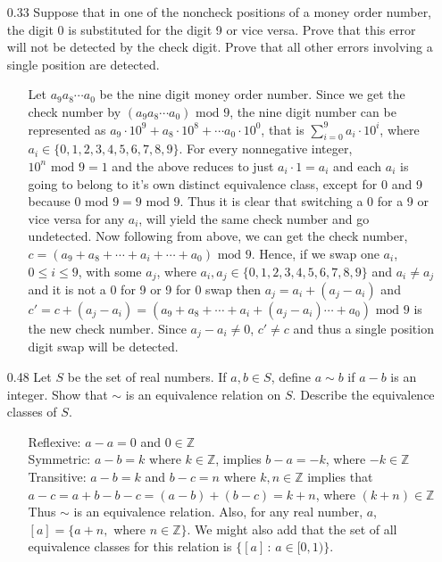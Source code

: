 \documentclass[12pt]{article}
\begin{document}
\begin{enumerate}
\begin{enumerate}
\end{enumerate}

\item[0.33] Suppose that in one of the noncheck positions of a money order number, the
digit 0 is substituted for the digit 9 or vice versa. Prove that this error will not be detected
by the check digit. Prove that all other errors involving a single position are detected.
\begin{enumerate}
\item[] Let $a_9a_8\cdots a_0$ be the nine digit money order number. Since we get the check number 
by $(a_9a_8\cdots a_0)\mbox{ mod }9$, the nine digit number can be represented as 
$a_9\cdot 10^9 + a_8\cdot 10^8 + \cdots a_0\cdot 10^0$, that is 
$\sum^9_{i = 0}a_i\cdot 10^i$, where $a_i \in \{0, 1, 2, 3, 4, 5, 6, 7, 8, 9\}$. 
For every nonnegative integer, $10^n\mbox{ mod } 9 = 1$ and the above reduces to just 
$a_i \cdot 1 = a_i$ and each $a_i$ is going to belong to it's own distinct equivalence class, 
except for 0 and 9 because $0\mbox{ mod } 9 = 9\mbox{ mod }9$.
Thus it is clear that switching a 0 for a 9 or vice versa for any $a_i$, will yield the 
same check number and go undetected. Now following from above, we can get the check number, \\
$c = (a_9 + a_8 + \cdots + a_i + \cdots + a_0)\mbox{ mod } 9$. Hence, if we swap one $a_i$, 
$0 \leq i \leq 9$, with some $a_j$, where $a_i, a_j \in \{0, 1, 2, 3, 4, 5, 6, 7, 8, 9\}$ 
and $a_i \neq a_j$ and it is not a 0 for 9 or 9 for 0 swap then $a_j = a_i + (a_j - a_i)$ 
and $c' = c + (a_j - a_i) = (a_9 + a_8 + \cdots + a_i + (a_j - a_i) \cdots + a_0)\mbox{ mod } 9$ 
is the new check number. Since $a_j - a_i \neq 0$, $c' \neq c$ and thus a single position 
digit swap will be detected.
\end{enumerate}

\item[0.48] Let $S$ be the set of real numbers. If $a, b \in S$, define $a \sim b$ if $a-b$
is an integer. Show that $\sim$ is an equivalence relation on $S$. Describe the equivalence
classes of $S$.
\begin{enumerate}
\item[] Reflexive: $a - a = 0$ and $0 \in \mathbb{Z}$ \\
Symmetric: $a - b = k$ where $k \in \mathbb{Z}$, implies $b - a = -k$, where $-k \in \mathbb{Z}$ \\
Transitive: $a - b = k$ and $b - c = n$ where $k, n \in \mathbb{Z}$ implies that 
$a - c = a + b - b - c = (a - b) + (b - c) = k + n$, where $(k + n) \in \mathbb{Z}$ \\
Thus $\sim$ is an equivalence relation. Also, for any real number, $a$, \\
$[a] = \{a + n, $ where $n \in \mathbb{Z}\}$. We might also add that the set of all 
equivalence classes for this relation is $\{ [a]\, :\, a \in [0, 1) \}$.
\end{enumerate}


\end{enumerate}
\end{document}
